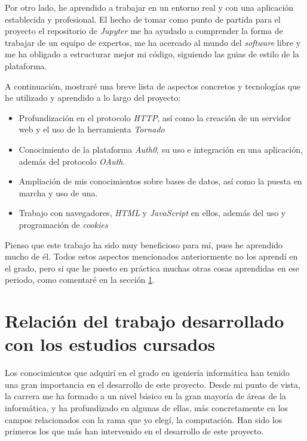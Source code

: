 \documentclass[11pt,spanish,listoffigures]{tfgetsinf}
\begin{document}
Por otro lado, he aprendido a trabajar en un entorno real y con una aplicación establecida y profesional. El hecho de tomar como punto de partida para el proyecto el repositorio de \textit{Jupyter} me ha ayudado a comprender la forma de trabajar de un equipo de expertos, me ha acercado al mundo del \textit{software} libre y me ha obligado a estructurar mejor mi código, siguiendo las guias de estilo de la plataforma.

A continuación, mostraré una breve lista de aspectos concretos y tecnologías que he utilizado y aprendido a lo largo del proyecto:

\begin{itemize}

\item Profundización en el protocolo \textit{HTTP}, así como la creación de un servidor web y el uso de la herramienta \textit{Tornado}

\item Conocimiento de la plataforma \textit{Auth0}, su uso e integración en una aplicación, además del protocolo \textit{OAuth}.

\item Ampliación de mis conocimientos sobre bases de datos, así como la puesta en marcha y uso de una.

\item Trabajo con navegadores, \textit{HTML} y \textit{JavaScript} en ellos, además del uso y programación de \textit{cookies} 
\end{itemize}

Pienso que este trabajo ha sido muy beneficioso para mí, pues he aprendido mucho de él. Todos estos aspectos mencionados anteriormente no los aprendí en el grado, pero si que he puesto en práctica muchas otras cosas aprendidas en ese periodo, como comentaré en la sección \ref{sec:estudios-cursados}.


\section{Relación del trabajo desarrollado con los estudios cursados}
\label{sec:estudios-cursados}

Los conocimientos que adquirí en el grado en igeniería informática han tenido una gran importancia en el desarrollo de este proyecto. Desde mi punto de vista, la carrera me ha formado a un nivel básico en la gran mayoría de áreas de la informática, y ha profundizado en algunas de ellas, más concretamente en los campos relacionados con la rama que yo elegí, la computación. Han sido los primeros los que más han intervenido en el desarrollo de este proyecto.
\end{document}
